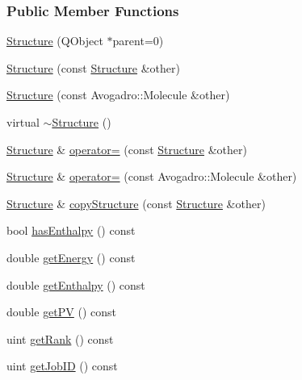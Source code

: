 \subsubsection*{Public Member Functions}
\begin{DoxyCompactItemize}
\item 
\hyperlink{classGlobalSearch_1_1Structure_ab7e8a0041535442bca879148833831ac}{Structure} (Q\+Object $\ast$parent=0)
\item 
\hyperlink{classGlobalSearch_1_1Structure_ad5f2adb0f379ee6dde14984df3eb73bc}{Structure} (const \hyperlink{classGlobalSearch_1_1Structure}{Structure} \&other)
\item 
\hyperlink{classGlobalSearch_1_1Structure_a2630d5c42da1cd86bd0c3b7d79e69618}{Structure} (const Avogadro\+::\+Molecule \&other)
\item 
virtual \hyperlink{classGlobalSearch_1_1Structure_a29cc3acd03872d7641a2fd76a53e0491}{$\sim$\+Structure} ()
\item 
\hyperlink{classGlobalSearch_1_1Structure}{Structure} \& \hyperlink{classGlobalSearch_1_1Structure_a4b257e8547d62da1c2393c123da994f1}{operator=} (const \hyperlink{classGlobalSearch_1_1Structure}{Structure} \&other)
\item 
\hyperlink{classGlobalSearch_1_1Structure}{Structure} \& \hyperlink{classGlobalSearch_1_1Structure_a22737e6da3810566ad0b8c6b672e1214}{operator=} (const Avogadro\+::\+Molecule \&other)
\item 
\hyperlink{classGlobalSearch_1_1Structure}{Structure} \& \hyperlink{classGlobalSearch_1_1Structure_accb684b9686676fd61164f298460f195}{copy\+Structure} (const \hyperlink{classGlobalSearch_1_1Structure}{Structure} \&other)
\item 
bool \hyperlink{classGlobalSearch_1_1Structure_a6f963ec03dda49caa05f5eb8a9f19c39}{has\+Enthalpy} () const 
\item 
double \hyperlink{classGlobalSearch_1_1Structure_acc6db7487d8bbeacda3868734f4294bd}{get\+Energy} () const 
\item 
double \hyperlink{classGlobalSearch_1_1Structure_a45e5069495574ae2d4b73a1759b7326b}{get\+Enthalpy} () const 
\item 
double \hyperlink{classGlobalSearch_1_1Structure_a66f08d0683f89fa6791b5b7b9838955d}{get\+P\+V} () const 
\item 
uint \hyperlink{classGlobalSearch_1_1Structure_aad467ff9bf423156b7cc8df3a2fb7b13}{get\+Rank} () const 
\item 
uint \hyperlink{classGlobalSearch_1_1Structure_a6d044ecacb068406234a502d30664bea}{get\+Job\+I\+D} () const 

\end{DoxyCompactItemize}
